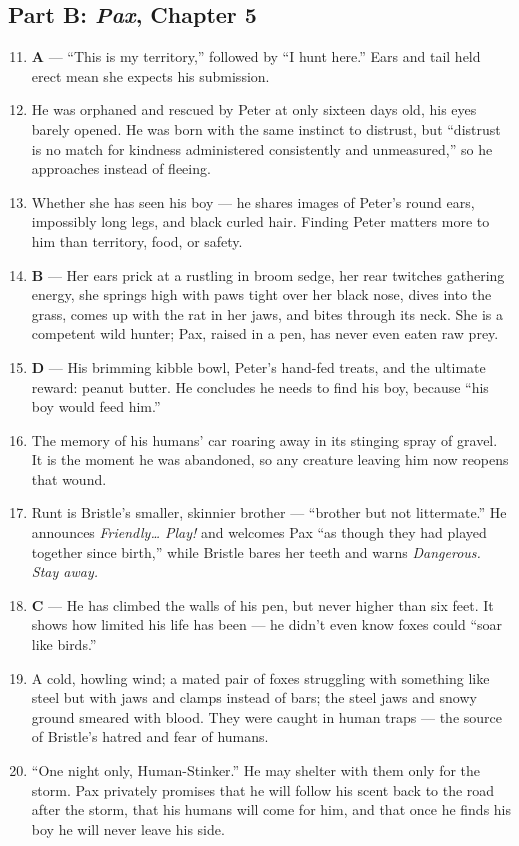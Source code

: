 \documentclass[11pt]{article}
\begin{document}
\subsection*{Part B: \textit{Pax}, Chapter 5}
\begin{enumerate}\setcounter{enumi}{10}
  \item \textbf{A} --- ``This is my territory,'' followed by ``I hunt here.'' Ears and tail held erect mean she expects his submission.
  \item He was orphaned and rescued by Peter at only sixteen days old, his eyes barely opened. He was born with the same instinct to distrust, but ``distrust is no match for kindness administered consistently and unmeasured,'' so he approaches instead of fleeing.
  \item Whether she has seen his boy --- he shares images of Peter's round ears, impossibly long legs, and black curled hair. Finding Peter matters more to him than territory, food, or safety.
  \item \textbf{B} --- Her ears prick at a rustling in broom sedge, her rear twitches gathering energy, she springs high with paws tight over her black nose, dives into the grass, comes up with the rat in her jaws, and bites through its neck. She is a competent wild hunter; Pax, raised in a pen, has never even eaten raw prey.
  \item \textbf{D} --- His brimming kibble bowl, Peter's hand-fed treats, and the ultimate reward: peanut butter. He concludes he needs to find his boy, because ``his boy would feed him.''
  \item The memory of his humans' car roaring away in its stinging spray of gravel. It is the moment he was abandoned, so any creature leaving him now reopens that wound.
  \item Runt is Bristle's smaller, skinnier brother --- ``brother but not littermate.'' He announces \textit{Friendly\dots{} Play!} and welcomes Pax ``as though they had played together since birth,'' while Bristle bares her teeth and warns \textit{Dangerous. Stay away.}
  \item \textbf{C} --- He has climbed the walls of his pen, but never higher than six feet. It shows how limited his life has been --- he didn't even know foxes could ``soar like birds.''
  \item A cold, howling wind; a mated pair of foxes struggling with something like steel but with jaws and clamps instead of bars; the steel jaws and snowy ground smeared with blood. They were caught in human traps --- the source of Bristle's hatred and fear of humans.
  \item ``One night only, Human-Stinker.'' He may shelter with them only for the storm. Pax privately promises that he will follow his scent back to the road after the storm, that his humans will come for him, and that once he finds his boy he will never leave his side.
\end{enumerate}
\end{document}
